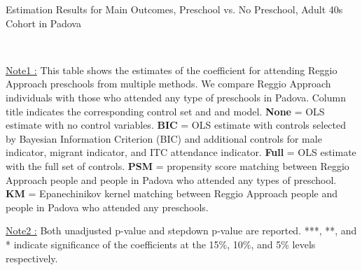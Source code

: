 \begin{table}[H] \caption{Estimation Results for Main Outcomes, Preschool vs. No Preschool, Adult 40s Cohort in Padova} \label{ols-M-adult40-reg-pres-padova}
\scalebox{0.62}{}
\vspace{1ex} \\
\footnotesize\raggedright{\underline{Note1 :} This table shows the estimates of the coefficient for attending Reggio Approach preschools from multiple methods. We compare Reggio Approach individuals with those who attended any type of preschools in Padova. Column title indicates the corresponding control set and and model. \textbf{None} = OLS estimate with no control variables. \textbf{BIC} = OLS estimate with controls selected by Bayesian Information Criterion (BIC) and additional controls for male indicator, migrant indicator, and ITC attendance indicator. \textbf{Full} = OLS estimate with the full set of controls. \textbf{PSM} =  propensity score matching between Reggio Approach people and people in Padova who attended any types of preschool. \textbf{KM} = Epanechinikov kernel matching between Reggio Approach people and people in Padova who attended any preschools.}

\footnotesize\raggedright{\underline{Note2 :} Both unadjusted p-value and stepdown p-value are reported. ***, **, and * indicate significance of the coefficients at the 15\%, 10\%, and 5\% levels respectively.}

\end{table}




